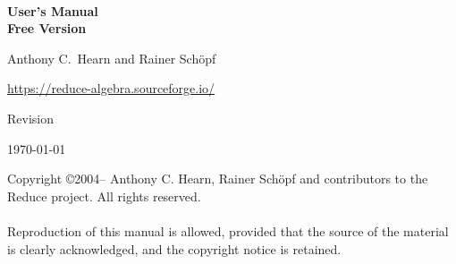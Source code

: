 \begin{titlepage}
\setcounter{page}{-1}
\vspace*{\fill}
\begin{center}

{\Huge\bf {\REDUCE}} \\ [0.2cm]
{\LARGE\bf User's Manual\vspace{0.4cm} \\
  Free Version \\[0.5in]

}

\large\bf

Anthony C.\ Hearn %
and
Rainer Sch\"{o}pf

\vspace{0.1in}

\url{https://reduce-algebra.sourceforge.io/}

\vspace{0.5in}

Revision 

\vspace{0.1in}

\today

\end{center}
\vspace{3.0in}
\end{titlepage}

\newpage
\vspace*{3.0in}
\noindent Copyright \copyright 2004--\the\year{} Anthony C. Hearn,
Rainer Sch\"{o}pf and contributors to the Reduce project.
All rights reserved. \\
\mbox{}\\
%
\noindent Reproduction of this manual is allowed, provided that the source of the
material is clearly acknowledged, and the copyright notice is retained.
